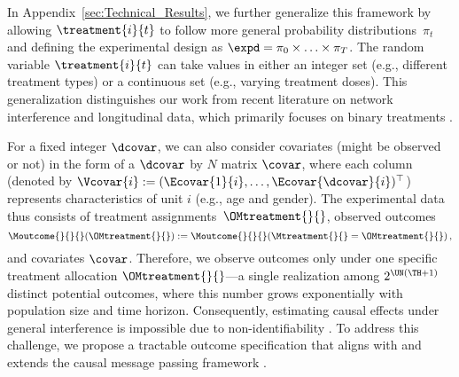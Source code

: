 \begin{remark}
In Appendix~\ref{sec:Technical_Results}, we further generalize this framework by allowing $\treatment{i}{t}$ to follow more general probability distributions~$\pi_t$ and defining the experimental design as $\expd = \pi_0 \times \ldots \times \pi_T$. The random variable $\treatment{i}{t}$ can take values in either an integer set (e.g., different treatment types) or a continuous set (e.g., varying treatment doses). This generalization distinguishes our work from recent literature on network interference and longitudinal data, which primarily focuses on binary treatments \citep{arkhangelsky2023causal}.
\end{remark}

For a fixed integer $\dcovar$, we can also consider covariates (might be observed or not) in the form of a $\dcovar$ by $N$ matrix $\covar$, where each column (denoted by $\Vcovar{i} := (\Ecovar{1}{i}, \ldots,  \Ecovar{\dcovar}{i})^\top$) represents characteristics of unit $i$ (e.g., age and gender). The experimental data thus consists of treatment assignments~$\OMtreatment{}{}$, observed outcomes 
%
\[
\Moutcome{}{}{}(\OMtreatment{}{}) := \Moutcome{}{}{}(\Mtreatment{}{}=\OMtreatment{}{})\,,
\]
%
and covariates $\covar$. Therefore, we observe outcomes only under one specific treatment allocation $\OMtreatment{}{}$—a single realization among $2^{\UN (\TH+1)}$ distinct potential outcomes, where this number grows exponentially with population size and time horizon. Consequently, estimating causal effects under general interference is impossible due to non-identifiability \citep{karwa2018systematic}. To address this challenge, we propose a tractable outcome specification that aligns with and extends the causal message passing framework \citep{shirani2024causal}.


